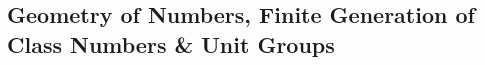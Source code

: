 \newpage
\subsection{Geometry of Numbers, Finite Generation of Class Numbers \& Unit Groups \label{sec:620_20}}